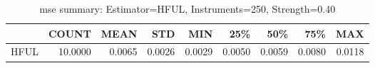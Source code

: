 \begin{table}[ht]
\centering
\caption{mse summary: Estimator=HFUL, Instruments=250, Strength=0.40}
\begin{tabular}{lrrrrrrrr}
\toprule
 & COUNT & MEAN & STD & MIN & 25\% & 50\% & 75\% & MAX \\
\midrule
HFUL & 10.0000 & 0.0065 & 0.0026 & 0.0029 & 0.0050 & 0.0059 & 0.0080 & 0.0118 \\
\bottomrule
\end{tabular}
\end{table}
